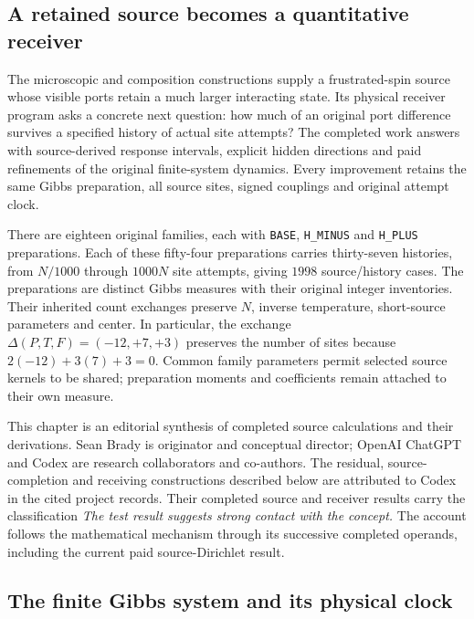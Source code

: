 \label{ch:spin-physical}

\subsection{A retained source becomes a quantitative receiver}

The microscopic and composition constructions supply a frustrated-spin source whose visible ports retain a much larger interacting state. Its physical receiver program asks a concrete next question: how much of an original port difference survives a specified history of actual site attempts? The completed work answers with source-derived response intervals, explicit hidden directions and paid refinements of the original finite-system dynamics. Every improvement retains the same Gibbs preparation, all source sites, signed couplings and original attempt clock.

There are eighteen original families, each with \texttt{BASE}, \texttt{H\_MINUS} and \texttt{H\_PLUS} preparations. Each of these fifty-four preparations carries thirty-seven histories, from $N/1000$ through $1000N$ site attempts, giving $1998$ source/history cases. The preparations are distinct Gibbs measures with their original integer inventories. Their inherited count exchanges preserve $N$, inverse temperature, short-source parameters and center. In particular, the exchange $\Delta(P,T,F)=(-12,+7,+3)$ preserves the number of sites because $2(-12)+3(7)+3=0$. Common family parameters permit selected source kernels to be shared; preparation moments and coefficients remain attached to their own measure. 

This chapter is an editorial synthesis of completed source calculations and their derivations. Sean Brady is originator and conceptual director; OpenAI ChatGPT and Codex are research collaborators and co-authors. The residual, source-completion and receiving constructions described below are attributed to Codex in the cited project records. Their completed source and receiver results carry the classification \emph{The test result suggests strong contact with the concept.} The account follows the mathematical mechanism through its successive completed operands, including the current paid source-Dirichlet result.

\subsection{The finite Gibbs system and its physical clock}

